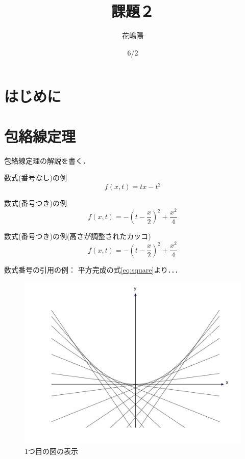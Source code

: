 \documentclass[11pt,a4j,fleqn]{jarticle}
\title{課題２}
\author{花嶋陽}
\date{6/2}
\begin{document}
\maketitle

\section{はじめに}



\section{包絡線定理}

包絡線定理の解説を書く．

数式(番号なし)の例
\[
f(x, t) = t x - t^2
\]


数式(番号つき)の例
\begin{equation}
f(x, t)  = -(t - \frac{x}{2})^2 + \frac{x^2}{4} \label{eq:square}
\end{equation}

数式(番号つき)の例(高さが調整されたカッコ)
\begin{equation}
f(x, t) = -\left(t - \frac{x}{2}\right)^2 + \frac{x^2}{4} \label{eq:square-2}
\end{equation}



数式番号の引用の例：
平方完成の式\eqref{eq:square}より．．．

\begin{figure}
 \centering
 \includegraphics[scale=0.5]{envelope0.pdf}
 \caption{1つ目の図の表示}
 \label{fig:1}
\end{figure}
\end{document}
